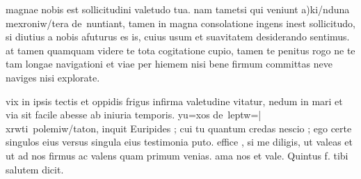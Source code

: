 


 magnae nobis est sollicitudini valetudo tua. nam tametsi qui veniunt a)ki/nduna me\n xroniw/tera de\ nuntiant, tamen in magna consolatione ingens inest sollicitudo, si diutius a nobis afuturus es is, cuius usum et suavitatem desiderando sentimus. at tamen quamquam videre te tota cogitatione cupio, tamen te penitus rogo ne te tam longae navigationi et viae per hiemem nisi bene firmum committas neve naviges nisi explorate.

 vix in ipsis tectis et oppidis frigus infirma valetudine vitatur, nedum in mari et via sit facile abesse ab iniuria temporis. yu=xos de\ leptw=| xrwti\ polemiw/taton, inquit Euripides ; cui tu quantum credas nescio ; ego certe singulos eius versus singula eius testimonia puto. effice , si me diligis, ut valeas et ut ad nos firmus ac valens quam primum venias. ama nos et vale. Quintus f. tibi salutem dicit.
